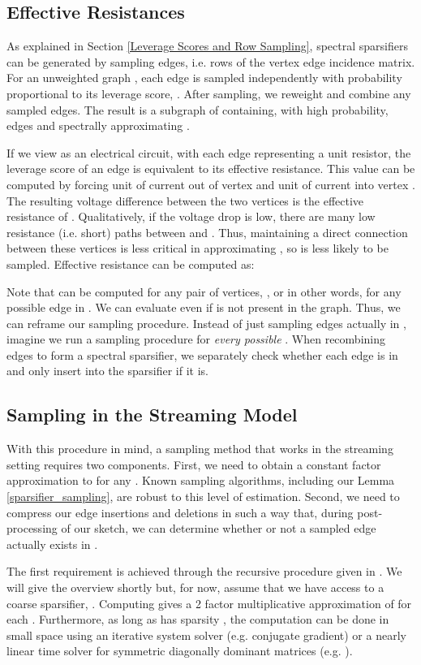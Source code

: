 \documentclass[11pt]{article}
\begin{document}
\subsection{Effective Resistances}
As explained in Section \ref{Leverage Scores and Row Sampling}, spectral sparsifiers can be generated by sampling edges, i.e. rows of the vertex edge incidence matrix. For an unweighted graph , each edge  is sampled independently with probability proportional to its leverage score, . After sampling, we reweight and combine any sampled edges. The result is a subgraph of  containing, with high probability,  edges and spectrally approximating .

If we view  as an electrical circuit, with each edge representing a unit resistor, the leverage score of an edge  is equivalent  to its effective resistance. This value can be computed by forcing  unit of current out of vertex  and  unit of current into vertex . The resulting voltage difference between the two vertices is the effective resistance of . Qualitatively, if the voltage drop is low, there are many low resistance (i.e. short) paths between  and . Thus, maintaining a direct connection between these vertices is less critical in approximating , so  is less likely to be sampled.
Effective resistance can be computed as:



Note that  can be computed for any pair of vertices, , or in other words, for any possible edge in . We can evaluate   even if  is not present in the graph. Thus, we can reframe our sampling procedure. Instead of just sampling edges actually in , imagine we run a sampling procedure for \emph{every possible} . When recombining edges to form a spectral sparsifier, we separately check whether each edge  is in  and only insert into the sparsifier if it is. 
\subsection{Sampling in the Streaming Model}
With this procedure in mind, a sampling method that works in the streaming setting requires two components. First, we need to obtain a constant factor approximation to  for any . Known sampling algorithms, including our Lemma \ref{sparsifier_sampling}, are robust to this level of estimation. Second, we need to compress our edge insertions and deletions in such a way that, during post-processing of our sketch, we can determine whether or not a sampled edge  actually exists in . 

The first requirement is achieved through the recursive procedure given in \cite{pengV1}. We will give the overview shortly but, for now, assume that we have access to a coarse sparsifier, . Computing  gives a 2 factor multiplicative  approximation of  for each . Furthermore, as long as  has sparsity , the computation can be done in small space using an iterative system solver (e.g. conjugate gradient) or a nearly linear time solver for symmetric diagonally dominant matrices (e.g. \cite{koutis2011nearly}).
\end{document}
